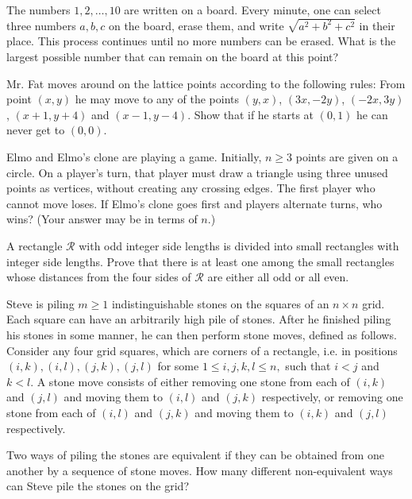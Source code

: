 \documentclass{article}
\begin{document}
\begin{prob}{3}
The numbers $1, 2,\ldots , 10$ are written on a board. Every minute, one can select three numbers $a, b, c$ on the board, erase them, and write $\sqrt{a^{2}+b^{2}+c^{2}}$ in their place. This process continues until no more numbers can be erased. What is the largest possible number that can remain on the board at this point?
\end{prob}


\begin{prob}[ELMO 1999/2]{3}
Mr. Fat moves around on the lattice points according to the following rules: From point $(x,y)$ he may move to any of the points $(y,x)$, $(3x,-2y)$, $(-2x,3y)$, $(x+1,y+4)$ and $(x-1,y-4)$. Show that if he starts at $(0,1)$ he can never get to $(0,0)$.
\end{prob}


\begin{req}[ELMO SL 2019/C1]{3}
Elmo and Elmo's clone are playing a game. Initially, $n\geq 3$ points are given on a circle. On a player's turn, that player must draw a triangle using three unused points as vertices, without creating any crossing edges. The first player who cannot move loses. If Elmo's clone goes first and players alternate turns, who wins? (Your answer may be in terms of $n$.)
\end{req}


\begin{prob}[ISL 2017/C1]{6}
A rectangle $\mathcal{R}$ with odd integer side lengths is divided into small rectangles with integer side lengths. Prove that there is at least one among the small rectangles whose distances from the four sides of $\mathcal{R}$ are either all odd or all even.
\end{prob}

\begin{prob}[USAMO 2015/4]{13}
Steve is piling $m \geq 1$ indistinguishable stones on the squares of an $n \times n$ grid. Each square can have an arbitrarily high pile of stones. After he finished piling his stones in some manner, he can then perform stone moves, defined as follows. Consider any four grid squares, which are corners of a rectangle, i.e. in positions $(i, k),(i, l),(j, k),(j, l)$ for some $1 \leq i, j, k, l \leq n,$ such that $i<j$ and $k<l .$ A stone move consists of either removing one stone from each of $(i, k)$ and $(j, l)$ and moving them to $(i, l)$ and $(j, k)$ respectively, or removing one stone from each of $(i, l)$ and $(j, k)$ and moving them to $(i, k)$ and $(j, l)$ respectively.

Two ways of piling the stones are equivalent if they can be obtained from one another by a sequence of stone moves. How many different non-equivalent ways can Steve pile the stones on the grid?
\end{prob} 
\end{document}
